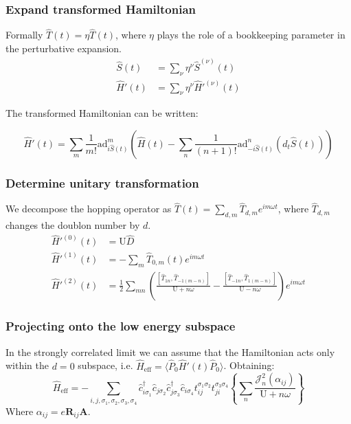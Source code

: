 \documentclass{beamer}
\newcommand{\bs}[1] {\boldsymbol{#1}}
\begin{document}

\begin{frame}
\frametitle{Expand transformed Hamiltonian}
Formally $\hat{T}(t) = \eta\hat{T}(t)$, where $\eta$ plays the role of a bookkeeping parameter in the perturbative expansion.
\begin{align*}
\hat{S}(t) &= \sum_\nu \eta^\nu \hat{S}^{(\nu)}(t) \\
\hat{H}'(t) &= \sum_\nu \eta^\nu \hat{H}'^{(\nu)}(t)
\end{align*}

The transformed Hamiltonian can be written:

\begin{equation*} 
\hat{H}'(t) = \sum_m \frac{1}{m!} \text{ad}_{i\hat{S}(t)}^m \left( \hat{H}(t) - \sum_n \frac{1}{(n+1)!}\text{ad}_{-i\hat{S}(t)}^n (d_t \hat{S}(t)) \right)
\end{equation*}
\end{frame}


\begin{frame}
\frametitle{Determine unitary transformation}
We decompose the hopping operator as $\hat{T}(t) = \sum_{d,m} \hat{T}_{d,m}e^{im\omega t}$, where $\hat{T}_{d,m}$ changes the doublon number by $d$.
\begin{align*}
\hat{H}'^{(0)}(t) &= \text{U}\hat{D} \\
\hat{H}'^{(1)}(t) &= -\sum_m \hat{T}_{0,m}(t)e^{im\omega t} \\
\hat{H}'^{(2)}(t) &= \frac{1}{2}\sum_{mn} \left( \frac{\left[\hat{T}_{1n}, \hat{T}_{-1(m-n)} \right]}{\text{U}+n\omega} - \frac{\left[\hat{T}_{-1n}, \hat{T}_{1(m-n)} \right]}{\text{U}-n\omega} \right) e^{im\omega t}
\end{align*}
\end{frame}


\begin{frame}
\frametitle{Projecting onto the low energy subspace}
In the strongly correlated limit we can assume that the Hamiltonian acts only within the $d=0$ subspace, i.e. $\hat{H}_{\text{eff}}=\langle \hat{P}_0\hat{H}'(t)\hat{P}_0 \rangle$. Obtaining:
\begin{equation*}
\hat{H}_{\text{eff}} = - \sum_{i,j, \sigma_1, \sigma_2, \sigma_3, \sigma_4}\hat{c}_{i \sigma_1}^\dagger \hat{c}_{j \sigma_2} \hat{c}_{j \sigma_3}^\dagger \hat{c}_{i \sigma_4} t_{ij}^{\sigma_1 \sigma_2} t_{ji}^{\sigma_3 \sigma_4} \left\{ \sum_{n} \frac{\mathcal{J}_{n}^2(\alpha_{ij})}{\text{U}+n\omega} \right\}
\end{equation*}
Where $\alpha_{ij} = e\bs{R}_{ij}\bs{A}$.
\end{frame}
\end{document}
